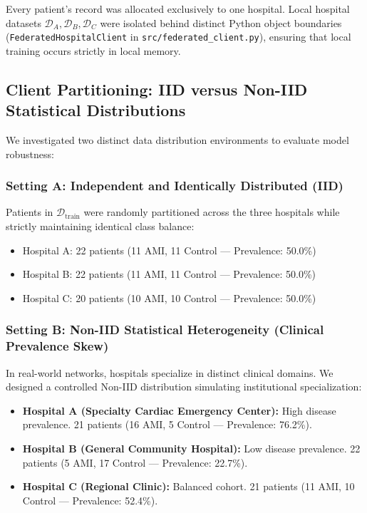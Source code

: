Every patient's record was allocated exclusively to one hospital. Local hospital datasets $\mathcal{D}_A, \mathcal{D}_B, \mathcal{D}_C$ were isolated behind distinct Python object boundaries (\texttt{FederatedHospitalClient} in \texttt{src/federated\_client.py}), ensuring that local training occurs strictly in local memory.

\subsection{Client Partitioning: IID versus Non-IID Statistical Distributions}
\label{subsec:iid_non_iid}

We investigated two distinct data distribution environments to evaluate model robustness:

\subsubsection{Setting A: Independent and Identically Distributed (IID)}
Patients in $\mathcal{D}_{\text{train}}$ were randomly partitioned across the three hospitals while strictly maintaining identical class balance:
\begin{itemize}
    \item Hospital A: 22 patients (11 AMI, 11 Control — Prevalence: 50.0\%)
    \item Hospital B: 22 patients (11 AMI, 11 Control — Prevalence: 50.0\%)
    \item Hospital C: 20 patients (10 AMI, 10 Control — Prevalence: 50.0\%)
\end{itemize}

\subsubsection{Setting B: Non-IID Statistical Heterogeneity (Clinical Prevalence Skew)}
In real-world networks, hospitals specialize in distinct clinical domains. We designed a controlled Non-IID distribution simulating institutional specialization:
\begin{itemize}
    \item \textbf{Hospital A (Specialty Cardiac Emergency Center):} High disease prevalence. 21 patients (16 AMI, 5 Control — Prevalence: 76.2\%).
    \item \textbf{Hospital B (General Community Hospital):} Low disease prevalence. 22 patients (5 AMI, 17 Control — Prevalence: 22.7\%).
    \item \textbf{Hospital C (Regional Clinic):} Balanced cohort. 21 patients (11 AMI, 10 Control — Prevalence: 52.4\%).
\end{itemize}

